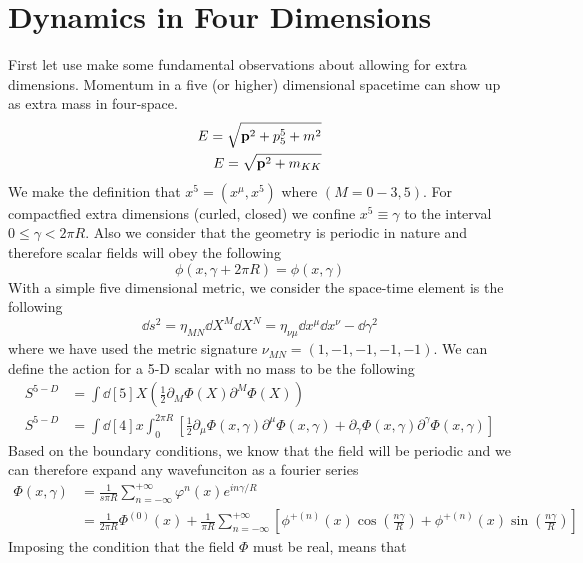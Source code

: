 \documentclass[12pt]{article}
\newcommand{\pd}{\partial}
\renewcommand{\vb}{\vectorbold}
\begin{document}
\section{Dynamics in Four Dimensions}
First let use make some fundamental observations about allowing for extra
dimensions. Momentum in a five (or higher) dimensional spacetime can show up as
extra mass in four-space. 
\begin{align}
    E = \sqrt{\vb{p}^2 + p_5^5 + m^2} \\
    E = \sqrt{\vb{p}^2 + m_{KK}}
\end{align}
We make the definition that $x^5 = (x^\mu,x^5)$ where $(M = 0-3,5)$. For
compactfied extra dimensions (curled, closed) we confine $x^5 \equiv \gamma$ to
the interval $0 \leq \gamma < 2\pi R$. Also we consider that the geometry is
periodic in nature and therefore scalar fields will obey the following
\begin{equation}
    \phi(x, \gamma + 2\pi R) = \phi (x,\gamma)
\end{equation}
With a simple five dimensional metric, we consider the space-time element is the
following
\begin{equation}
    \dd{s}^2 = \eta_{MN}\dd{X}^M\dd{X}^N = \eta_{\nu\mu}\dd{x}^\mu\dd{x}^\nu -
    \dd{\gamma}^2
\end{equation}
where we have used the metric signature $\nu_{MN} = (1,-1,-1,-1,-1)$.
We can define the action for a 5-D scalar with no mass to be the following
\begin{align}
    S^{5-D} &= \int \dd[5]{X} \left( \frac{1}{2} \pd_M \Phi(X) \pd^M
    \Phi(X) \right) \\
        S^{5-D} &= \int \dd[4]{x} \int^{2\pi R}_{0} \left[ \frac{1}{2} \pd_\mu \Phi(x,\gamma) \pd^\mu
    \Phi(x,\gamma) + \pd_\gamma \Phi(x,\gamma) \pd^\gamma
    \Phi(x,\gamma) \right]
\end{align}
Based on the boundary conditions, we know that the field will be periodic and we
can therefore expand any wavefunciton as a fourier series
\begin{align}
    \Phi(x,\gamma) &= \frac{1}{s\pi R} \sum^{+\infty}_{n=-\infty}
    \varphi^{n}(x)e^{in\gamma /R} \\
                   &= \frac{1}{2\pi R} \Phi^{(0)}(x) + \frac{1}{\pi R}
                   \sum^{+\infty}_{n=-\infty} \left[
                       \phi^{+(n)}(x)\cos\left( \frac{n\gamma}{R} \right) +
               \phi^{+(n)}(x)\sin\left( \frac{n\gamma}{R} \right) \right]
\end{align}
Imposing the condition that the field $\Phi$ must be real, means that
\end{document}
